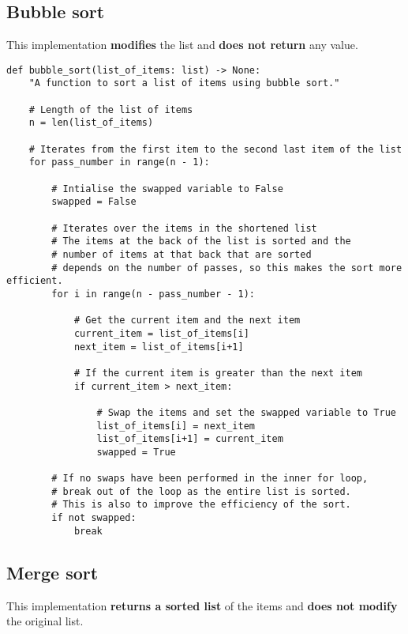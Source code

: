 \documentclass[11pt]{article}
\begin{document}
\subsection{Bubble sort}
\label{sec:org76fd66a}
This implementation \textbf{modifies} the list and \textbf{does not return} any value.
\begin{verbatim}
def bubble_sort(list_of_items: list) -> None:
    "A function to sort a list of items using bubble sort."

    # Length of the list of items
    n = len(list_of_items)

    # Iterates from the first item to the second last item of the list
    for pass_number in range(n - 1):

        # Intialise the swapped variable to False
        swapped = False

        # Iterates over the items in the shortened list
        # The items at the back of the list is sorted and the
        # number of items at that back that are sorted
        # depends on the number of passes, so this makes the sort more efficient.
        for i in range(n - pass_number - 1):

            # Get the current item and the next item
            current_item = list_of_items[i]
            next_item = list_of_items[i+1]

            # If the current item is greater than the next item
            if current_item > next_item:

                # Swap the items and set the swapped variable to True
                list_of_items[i] = next_item
                list_of_items[i+1] = current_item
                swapped = True

        # If no swaps have been performed in the inner for loop,
        # break out of the loop as the entire list is sorted.
        # This is also to improve the efficiency of the sort.
        if not swapped:
            break
\end{verbatim}
\subsection{Merge sort}
\label{sec:org515152e}
This implementation \textbf{returns a sorted list} of the items and \textbf{does not modify} the original list.
\end{document}
